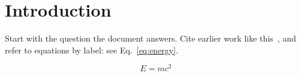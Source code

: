 \section{Introduction}

Start with the question the document answers. Cite earlier work like
this~\cite{knuth1984}, and refer to equations by label: see
Eq.~\eqref{eq:energy}.

\begin{equation}
  E = mc^2
  \label{eq:energy}
\end{equation}
